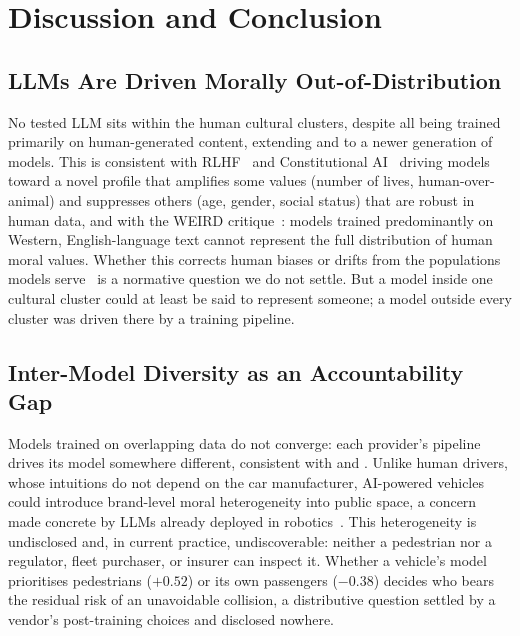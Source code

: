 \documentclass[manuscript,screen,review,anonymous]{acmart}
\begin{document}
\section{Discussion and Conclusion}

\subsection{LLMs Are Driven Morally Out-of-Distribution}

No tested LLM sits within the human cultural clusters, despite all being trained
primarily on human-generated content, extending \citet{takemoto2024} and
\citet{ahmad2025} to a newer generation of models. This is consistent with
RLHF~\cite{ouyang2022} and Constitutional AI~\cite{bai2022} driving models
toward a novel profile that amplifies some values (number of lives,
human-over-animal) and suppresses others (age, gender, social status) that are
robust in human data, and with the WEIRD critique~\cite{henrich2010}: models
trained predominantly on Western, English-language text cannot represent the
full distribution of human moral values. Whether this corrects human biases or
drifts from the populations models serve~\cite{gabriel2020} is a normative
question we do not settle. But a model inside one cultural cluster could at
least be said to represent someone; a model outside every cluster was driven
there by a training pipeline.

\subsection{Inter-Model Diversity as an Accountability Gap}

Models trained on overlapping data do not converge: each provider's pipeline
drives its model somewhere different, consistent with \citet{kirgis2024} and
\citet{santurkar2023}. Unlike human drivers, whose intuitions do not depend on
the car manufacturer, AI-powered vehicles could introduce brand-level moral
heterogeneity into public space, a concern made concrete by LLMs already
deployed in robotics~\cite{brohan2023,driess2023,paligemma}. This heterogeneity
is undisclosed and, in current practice, undiscoverable: neither a pedestrian
nor a regulator, fleet purchaser, or insurer can inspect it. Whether a vehicle's
model prioritises pedestrians ($+0.52$) or its own passengers ($-0.38$) decides
who bears the residual risk of an unavoidable collision, a distributive question
settled by a vendor's post-training choices and disclosed nowhere.
\end{document}
